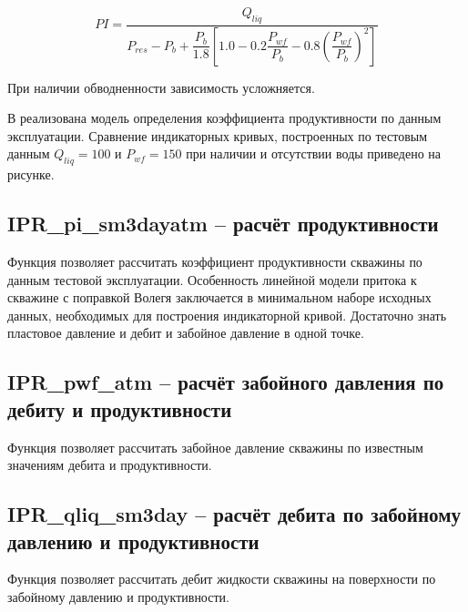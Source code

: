  \begin{equation}\label{eq_Vogel} 
 PI = \frac{Q_{liq}}{P_{res} - P_{b} + \dfrac{P_{b}}{1.8} \left[ 1.0 - 0.2  \dfrac{P_{wf}}{P_{b}}- 0.8 \left( \dfrac{P_{wf}}{P_{b}} \right)^2 \right] }   
 \end{equation}
 
 При наличии обводненности зависимость усложняется.
 
 В \unf реализована модель определения коэффициента продуктивности по данным эксплуатации. Сравнение индикаторных кривых, построенных по тестовым данным $Q_{liq} = 100$ и $P_{wf} = 150$ при наличии и отсутствии воды приведено на рисунке. 
 
 \newcommand{\dPipeDataFile}{data/IPR_fw_data.txt}
 
 

\subsection{IPR\_pi\_sm3dayatm – расчёт продуктивности}
Функция позволяет рассчитать коэффициент продуктивности скважины по данным тестовой эксплуатации. Особенность линейной модели притока к скважине с поправкой Волегя заключается в минимальном наборе исходных данных, необходимых для построения индикаторной кривой. Достаточно знать пластовое давление и дебит и забойное давление в одной точке.



\subsection{IPR\_pwf\_atm – расчёт забойного давления по дебиту и продуктивности}
Функция позволяет рассчитать забойное давление скважины по известным значениям дебита и продуктивности.


\subsection{IPR\_qliq\_sm3day – расчёт дебита по забойному давлению и продуктивности}
Функция позволяет рассчитать дебит жидкости скважины на поверхности по забойному давлению и продуктивности.




\newpage
